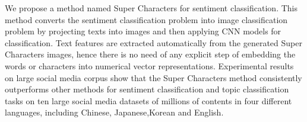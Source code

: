 We propose a method named Super Characters for sentiment classification. This method converts the sentiment classification problem into image classification problem by projecting texts into images and then applying CNN models for classification. Text features are extracted automatically from the generated Super Characters images, hence there is no need of any explicit step of embedding the words or characters into numerical vector representations. Experimental results on large social media corpus show that the Super Characters method consistently outperforms other methods for sentiment classification and topic classification tasks on ten large social media datasets of millions of contents in four different languages, including Chinese, Japanese,Korean and English.
